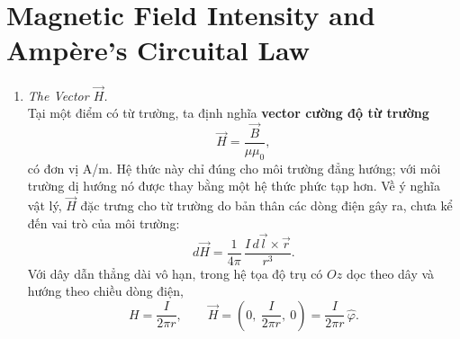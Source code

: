 \section{Magnetic Field Intensity and Ampère's Circuital Law}
\begin{enumerate}
\item \textit{The Vector $\vec{H}$.}\\
Tại một điểm có từ trường, ta định nghĩa \textbf{vector cường độ từ trường}
\[
\vec{H} = \frac{\vec{B}}{\mu\mu_0},
\]
có đơn vị A/m. Hệ thức này chỉ đúng cho môi trường đẳng hướng; với môi trường dị hướng nó được thay bằng một hệ thức phức tạp hơn. Về ý nghĩa vật lý, $\vec{H}$ đặc trưng cho từ trường do bản thân các dòng điện gây ra, chưa kể đến vai trò của môi trường:
\[
d\vec{H} = \frac{1}{4\pi}\,\frac{I\,d\vec{l} \times \vec{r}}{r^3}.
\]
Với dây dẫn thẳng dài vô hạn, trong hệ tọa độ trụ có $Oz$ dọc theo dây và hướng theo chiều dòng điện,
\[
H = \frac{I}{2\pi r},
\qquad
\vec{H} = \left(0,\ \frac{I}{2\pi r},\ 0\right) = \frac{I}{2\pi r}\,\hat{\varphi}.
\]


\end{enumerate}
